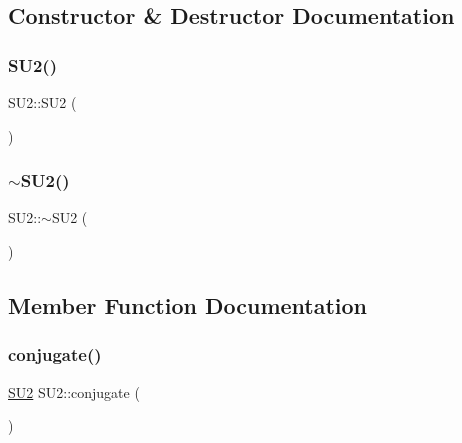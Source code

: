 \subsection{Constructor \& Destructor Documentation}
\mbox{\label{class_s_u2_a681fd5c1304d6f160686d7e9c0842ecb}} 
\subsubsection{\texorpdfstring{SU2()}{SU2()}}
{\footnotesize\ttfamily S\+U2\+::\+S\+U2 (\begin{DoxyParamCaption}{ }\end{DoxyParamCaption})\hspace{0.3cm}{\ttfamily [inline]}}

\mbox{\label{class_s_u2_a966f54ae31784aba31580b4569d83e1f}} 
\subsubsection{\texorpdfstring{$\sim$SU2()}{~SU2()}}
{\footnotesize\ttfamily S\+U2\+::$\sim$\+S\+U2 (\begin{DoxyParamCaption}{ }\end{DoxyParamCaption})\hspace{0.3cm}{\ttfamily [inline]}}



\subsection{Member Function Documentation}
\mbox{\label{class_s_u2_afb3a5fc8c00a45a0044113fb742727cc}} 
\subsubsection{\texorpdfstring{conjugate()}{conjugate()}}
{\footnotesize\ttfamily \mbox{\hyperlink{class_s_u2}{S\+U2}} S\+U2\+::conjugate (\begin{DoxyParamCaption}{ }\end{DoxyParamCaption})}

\mbox{\label{class_s_u2_a4f10c4617e00686b196653dd669e0697}} 
